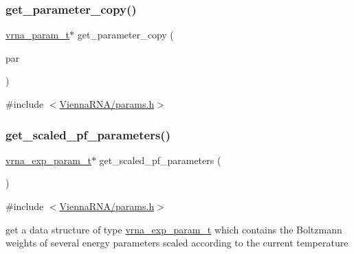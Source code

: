\mbox{\label{group__energy__parameters_ga1c252a1ef78410efcdcc1998f3c415cb}} 
\subsubsection{\texorpdfstring{get\+\_\+parameter\+\_\+copy()}{get\_parameter\_copy()}}
{\footnotesize\ttfamily \mbox{\hyperlink{group__energy__parameters_ga8a69ca7d787e4fd6079914f5343a1f35}{vrna\+\_\+param\+\_\+t}}$\ast$ get\+\_\+parameter\+\_\+copy (\begin{DoxyParamCaption}\item[{\mbox{\hyperlink{group__energy__parameters_ga8a69ca7d787e4fd6079914f5343a1f35}{vrna\+\_\+param\+\_\+t}} $\ast$}]{par }\end{DoxyParamCaption})}



{\ttfamily \#include $<$\mbox{\hyperlink{params_8h}{Vienna\+R\+N\+A/params.\+h}}$>$}

\mbox{\label{group__energy__parameters_gabf3b9271c41dd3fac02d56e0b02b3344}} 
\subsubsection{\texorpdfstring{get\+\_\+scaled\+\_\+pf\+\_\+parameters()}{get\_scaled\_pf\_parameters()}}
{\footnotesize\ttfamily \mbox{\hyperlink{group__energy__parameters_ga01d8b92fe734df8d79a6169482c7d8d8}{vrna\+\_\+exp\+\_\+param\+\_\+t}}$\ast$ get\+\_\+scaled\+\_\+pf\+\_\+parameters (\begin{DoxyParamCaption}\item[{void}]{ }\end{DoxyParamCaption})}



{\ttfamily \#include $<$\mbox{\hyperlink{params_8h}{Vienna\+R\+N\+A/params.\+h}}$>$}

get a data structure of type \mbox{\hyperlink{group__energy__parameters_ga01d8b92fe734df8d79a6169482c7d8d8}{vrna\+\_\+exp\+\_\+param\+\_\+t}} which contains the Boltzmann weights of several energy parameters scaled according to the current temperature

